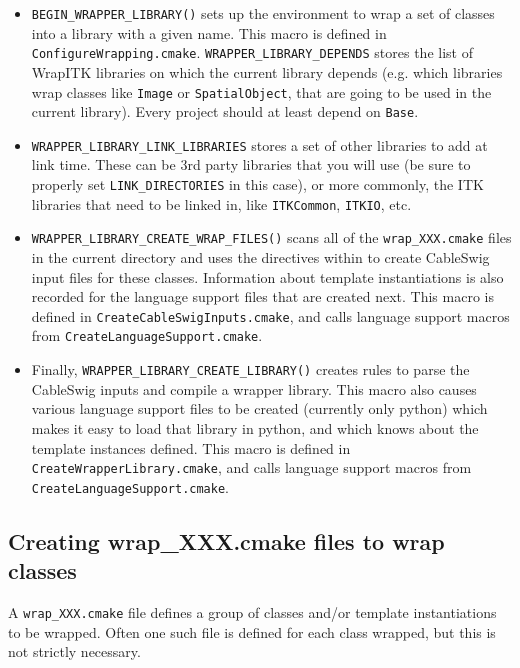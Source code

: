 \documentclass{InsightArticle}
\begin{document}
\begin{itemize}
  \item \verb$BEGIN_WRAPPER_LIBRARY()$ sets up the environment to wrap a set of classes into a
library with a given name. This macro is defined in \verb$ConfigureWrapping.cmake$.
\verb$WRAPPER_LIBRARY_DEPENDS$ stores the list of WrapITK libraries on which the
current library depends (e.g. which libraries wrap classes like \verb$Image$ or
\verb$SpatialObject$, that are going to be used in the current library). Every project
should at least depend on \verb$Base$.

  \item \verb$WRAPPER_LIBRARY_LINK_LIBRARIES$ stores a set of other libraries to add at link
time. These can be 3rd party libraries that you will use (be sure to properly set
\verb$LINK_DIRECTORIES$ in this case), or more commonly, the ITK libraries that need to
be linked in, like \verb$ITKCommon$, \verb$ITKIO$, etc.

  \item \verb$WRAPPER_LIBRARY_CREATE_WRAP_FILES()$ scans all of the \verb$wrap_XXX.cmake$ files in the
current directory and uses the directives within to create CableSwig input files
for these classes. Information about template instantiations is also recorded
for the language support files that are created next. This macro is defined in
\verb$CreateCableSwigInputs.cmake$, and calls language support macros from
\verb$CreateLanguageSupport.cmake$.

  \item Finally, \verb$WRAPPER_LIBRARY_CREATE_LIBRARY()$ creates rules to parse the CableSwig
inputs and compile a wrapper library. This macro also causes various language
support files to be created (currently only python) which makes it easy to load
that library in python, and which knows about the template instances defined.
This macro is defined in \verb$CreateWrapperLibrary.cmake$, and calls language support
macros from \verb$CreateLanguageSupport.cmake$.
\end{itemize}


     \subsection{Creating wrap\_XXX.cmake files to wrap classes}

A \verb$wrap_XXX.cmake$ file defines a group of classes and/or template instantiations
to be wrapped. Often one such file is defined for each class wrapped, but this
is not strictly necessary.
\end{document}
